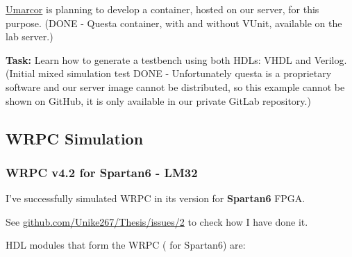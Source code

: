 \vspace{5mm}

\noindent \href{https://github.com/umarcor}{Umarcor} is planning to develop a container, hosted on our server, for this purpose. 
(DONE - Questa container, with and without VUnit, available on the lab server.)

\vspace{5mm}

\noindent \textbf{Task:} Learn how to generate a testbench using both HDLs: VHDL and Verilog.
(Initial mixed simulation test DONE - Unfortunately questa is a proprietary software and our server image cannot be distributed, so this example cannot be shown on GitHub, it is only available in our private GitLab repository.)

\subsection{WRPC Simulation}

\subsubsection{WRPC v4.2 for Spartan6 - LM32}
\label{list-wrpc}

I've successfully simulated WRPC \cite{WRPC:ohwr} in its  version for \textbf{Spartan6} FPGA.

\vspace{5mm}

\noindent See \href{https://github.com/Unike267/Thesis/issues/2}{github.com/Unike267/Thesis/issues/2} to check how I have done it.

\vspace{5mm}

\noindent HDL modules that form the WRPC ( for Spartan6) are:

\newpage 

